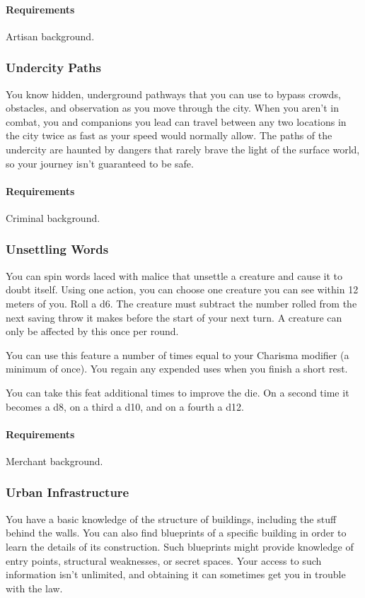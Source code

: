     \paragraph{Requirements} Artisan background.
\subsubsection{Undercity Paths} \label{feat::undercitypaths}
    You know hidden, underground pathways that you can use to bypass crowds, obstacles, and observation as you move through the city.
    When you aren't in combat, you and companions you lead can travel between any two locations in the city twice as fast as your speed would normally allow.
    The paths of the undercity are haunted by dangers that rarely brave the light of the surface world, so your journey isn't guaranteed to be safe.
    \paragraph{Requirements} Criminal background.
\subsubsection{Unsettling Words} \label{feat::unsettlingwords}
    You can spin words laced with malice that unsettle a creature and cause it to doubt itself.
    Using one action, you can choose one creature you can see within 12 meters of you.
    Roll a d6.
    The creature must subtract the number rolled from the next saving throw it makes before the start of your next turn.
    A creature can only be affected by this once per round.

    You can use this feature a number of times equal to your Charisma modifier (a minimum of once).
    You regain any expended uses when you finish a short rest.

    You can take this feat additional times to improve the die.
    On a second time it becomes a d8, on a third a d10, and on a fourth a d12.
    \paragraph{Requirements} Merchant background.
\subsubsection{Urban Infrastructure} \label{feat::urbaninfrastructure}
    You have a basic knowledge of the structure of buildings, including the stuff behind the walls.
    You can also find blueprints of a specific building in order to learn the details of its construction.
    Such blueprints might provide knowledge of entry points, structural weaknesses, or secret spaces.
    Your access to such information isn't unlimited, and obtaining it can sometimes get you in trouble with the law.
